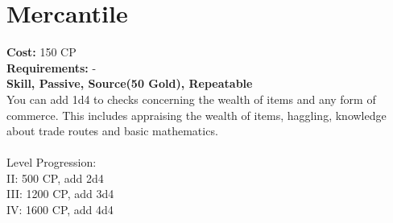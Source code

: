 \section{Mercantile}
\textbf{Cost:} 150 CP\\
\textbf{Requirements:} -\\
\textbf{Skill, Passive, Source(50 Gold), Repeatable}\\
You can add 1d4 to checks concerning the wealth of items and any form of commerce. This includes appraising the wealth of items, haggling, knowledge about trade routes and basic mathematics.\\
\\
Level Progression:\\
II: 500 CP, add 2d4\\
III: 1200 CP, add 3d4\\
IV: 1600 CP, add 4d4\\